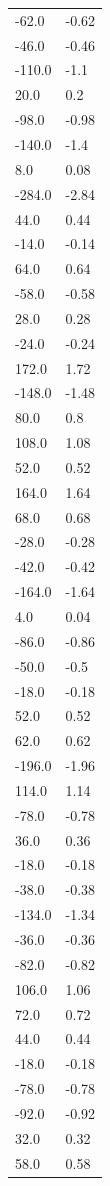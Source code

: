 \begin{longtable}{ll}
-62.0 & -0.62 \\
-46.0 & -0.46 \\
-110.0 & -1.1 \\
20.0 & 0.2 \\
-98.0 & -0.98 \\
-140.0 & -1.4 \\
8.0 & 0.08 \\
-284.0 & -2.84 \\
44.0 & 0.44 \\
-14.0 & -0.14 \\
64.0 & 0.64 \\
-58.0 & -0.58 \\
28.0 & 0.28 \\
-24.0 & -0.24 \\
172.0 & 1.72 \\
-148.0 & -1.48 \\
80.0 & 0.8 \\
108.0 & 1.08 \\
52.0 & 0.52 \\
164.0 & 1.64 \\
68.0 & 0.68 \\
-28.0 & -0.28 \\
-42.0 & -0.42 \\
-164.0 & -1.64 \\
4.0 & 0.04 \\
-86.0 & -0.86 \\
-50.0 & -0.5 \\
-18.0 & -0.18 \\
52.0 & 0.52 \\
62.0 & 0.62 \\
-196.0 & -1.96 \\
114.0 & 1.14 \\
-78.0 & -0.78 \\
36.0 & 0.36 \\
-18.0 & -0.18 \\
-38.0 & -0.38 \\
-134.0 & -1.34 \\
-36.0 & -0.36 \\
-82.0 & -0.82 \\
106.0 & 1.06 \\
72.0 & 0.72 \\
44.0 & 0.44 \\
-18.0 & -0.18 \\
-78.0 & -0.78 \\
-92.0 & -0.92 \\
32.0 & 0.32 \\
58.0 & 0.58 \\

\end{longtable}
